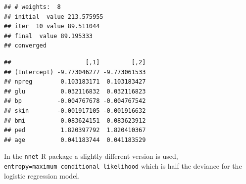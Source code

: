 \documentclass[10pt,ignorenonframetext,]{beamer}
\newenvironment{Shaded}{\begin{snugshade}}{\end{snugshade}}
\newcommand{\KeywordTok}[1]{\textcolor[rgb]{0.13,0.29,0.53}{\textbf{#1}}}
\newcommand{\DataTypeTok}[1]{\textcolor[rgb]{0.13,0.29,0.53}{#1}}
\newcommand{\DecValTok}[1]{\textcolor[rgb]{0.00,0.00,0.81}{#1}}
\newcommand{\FloatTok}[1]{\textcolor[rgb]{0.00,0.00,0.81}{#1}}
\newcommand{\StringTok}[1]{\textcolor[rgb]{0.31,0.60,0.02}{#1}}
\newcommand{\CommentTok}[1]{\textcolor[rgb]{0.56,0.35,0.01}{\textit{#1}}}
\newcommand{\OtherTok}[1]{\textcolor[rgb]{0.56,0.35,0.01}{#1}}
\newcommand{\OperatorTok}[1]{\textcolor[rgb]{0.81,0.36,0.00}{\textbf{#1}}}
\newcommand{\NormalTok}[1]{#1}
\begin{document}
\begin{frame}[fragile]

\tiny

\begin{Shaded}
\end{Shaded}

\begin{verbatim}
## # weights:  8
## initial  value 213.575955 
## iter  10 value 89.511044
## final  value 89.195333 
## converged
\end{verbatim}

\begin{Shaded}
\end{Shaded}

\begin{verbatim}
##                     [,1]         [,2]
## (Intercept) -9.773046277 -9.773061533
## npreg        0.103183171  0.103183427
## glu          0.032116832  0.032116823
## bp          -0.004767678 -0.004767542
## skin        -0.001917105 -0.001916632
## bmi          0.083624151  0.083623912
## ped          1.820397792  1.820410367
## age          0.041183744  0.041183529
\end{verbatim}

\normalsize
In the \texttt{nnet} R package a slightly different version is used,
\texttt{entropy=maximum\ conditional\ likelihood} which is half the
deviance for the logistic regression model.

\end{frame}
\end{document}
